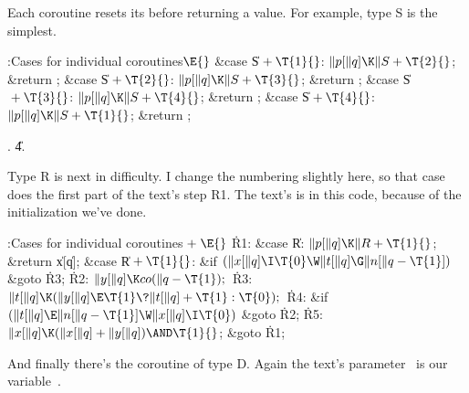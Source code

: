 Each coroutine resets its  before returning a value.
For example, type S is the simplest.

\Y\B\4:Cases for individual coroutines\X${}\E{}$\6
\4\&{case} \|S${}+\T{1}{}$:\5
${}\|p[\|q]\K\|S+\T{2}{}$;\5
\&{return} ;\6
\4\&{case} \|S${}+\T{2}{}$:\5
${}\|p[\|q]\K\|S+\T{3}{}$;\5
\&{return} ;\6
\4\&{case} \|S${}+\T{3}{}$:\5
${}\|p[\|q]\K\|S+\T{4}{}$;\5
\&{return} ;\6
\4\&{case} \|S${}+\T{4}{}$:\5
${}\|p[\|q]\K\|S+\T{1}{}$;\5
\&{return} ;\par
{}.
\U4.\fi

Type R is next in difficulty. I change the numbering slightly here,
so that case  does the first part of the text's step R1.
The text's  is  in this code, because of the
initialization we've done.

\Y\B\4:Cases for individual coroutines\X${}\mathrel+\E{}$\6
\4\.{R1}:\5
\&{case} \|R:\5
${}\|p[\|q]\K\|R+\T{1}{}$;\5
\&{return} \|x[\|q];\6
\4\&{case} \|R${}+\T{1}{}$:\5
\&{if} ${}(\|x[\|q]\I\T{0}\W\|t[\|q]\G\|n[\|q-\T{1}]){}$\1\5
\&{goto} \.{R3};\2\6
\4\.{R2}:\5
${}\|y[\|q]\K\\{co}(\|q-\T{1});{}$\6
\4\.{R3}:\5
${}\|t[\|q]\K(\|y[\|q]\E\T{1}\?\|t[\|q]+\T{1}:\T{0});{}$\6
\4\.{R4}:\5
\&{if} ${}(\|t[\|q]\E\|n[\|q-\T{1}]\W\|x[\|q]\I\T{0}){}$\1\5
\&{goto} \.{R2};\2\6
\4\.{R5}:\5
${}\|x[\|q]\K(\|x[\|q]+\|y[\|q])\AND\T{1}{}$;\5
\&{goto} \.{R1};\par
\fi

And finally there's the coroutine of type D. Again the text's parameter~%
is our variable~.

